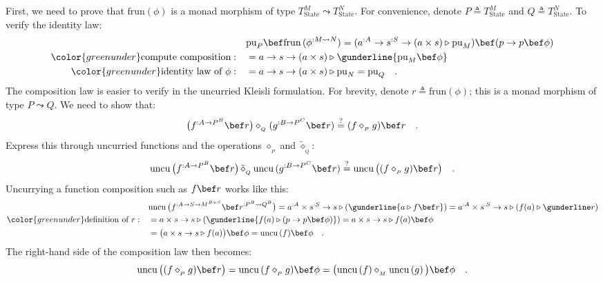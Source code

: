 First, we need to prove that $\text{frun}\left(\phi\right)$ is a
monad morphism of type $T_{\text{State}}^{M}\leadsto T_{\text{State}}^{N}$.
For convenience, denote $P\triangleq T_{\text{State}}^{M}$ and $Q\triangleq T_{\text{State}}^{N}$.
To verify the identity law:
\begin{align*}
 & \text{pu}_{P}\bef\text{frun}\,(\phi^{:M\leadsto N})=(a^{:A}\rightarrow s^{:S}\rightarrow(a\times s)\triangleright\text{pu}_{M})\bef(p\rightarrow p\bef\phi)\\
{\color{greenunder}\text{compute composition}:}\quad & =a\rightarrow s\rightarrow(a\times s)\triangleright\gunderline{\text{pu}_{M}\bef\phi}\\
{\color{greenunder}\text{identity law of }\phi:}\quad & =a\rightarrow s\rightarrow(a\times s)\triangleright\text{pu}_{N}=\text{pu}_{Q}\quad.
\end{align*}
The composition law is easier to verify in the uncurried Kleisli formulation.
For brevity, denote $r\triangleq\text{frun}\left(\phi\right)$; this
is a monad morphism of type $P\leadsto Q$. We need to show that:
\[
\big(f^{:A\rightarrow P^{B}}\bef r\big)\diamond_{_{Q}}(g^{:B\rightarrow P^{C}}\bef r)\overset{?}{=}(f\diamond_{_{P}}g)\bef r\quad.
\]
Express this through uncurried functions and the operations $\diamond_{_{P}}$
and $\tilde{\diamond}_{_{Q}}$:
\[
\text{uncu}\,\big(f^{:A\rightarrow P^{B}}\bef r\big)\,\tilde{\diamond}_{_{Q}}\,\text{uncu}\,(g^{:B\rightarrow P^{C}}\bef r)\overset{?}{=}\text{uncu}\,\big((f\diamond_{_{P}}g)\bef r\big)\quad.
\]
Uncurrying a function composition such as $f\bef r$ works like this:
\begin{align}
 & \text{uncu}\,\big(f^{:A\rightarrow S\rightarrow M^{B\times S}}\bef r^{:P^{B}\leadsto Q^{B}}\big)=a^{:A}\times s^{:S}\rightarrow s\triangleright(\gunderline{a\triangleright f\bef r})=a^{:A}\times s^{:S}\rightarrow s\triangleright(f(a)\triangleright\gunderline r)\nonumber \\
{\color{greenunder}\text{definition of }r:}\quad & =a\times s\rightarrow s\triangleright(\gunderline{f(a)\triangleright(p\rightarrow p\bef\phi)})=a\times s\rightarrow s\triangleright f(a)\bef\phi\nonumber \\
 & =\big(a\times s\rightarrow s\triangleright f(a)\big)\bef\phi=\text{uncu}\,(f)\bef\phi\quad.\label{eq:uncurry-state-composition-derivation1}
\end{align}
The right-hand side of the composition law then becomes:
\[
\text{uncu}\,\big((f\diamond_{_{P}}g)\bef r\big)=\text{uncu}\,(f\diamond_{_{P}}g)\bef\phi=\big(\text{uncu}\left(f\right)\diamond_{_{M}}\text{uncu}\left(g\right)\big)\bef\phi\quad.
\]
